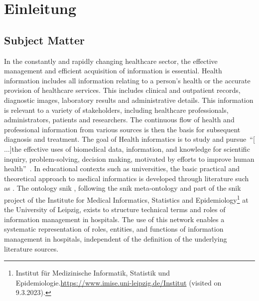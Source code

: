 \chapter{Einleitung}\label{ch:introduction}
\section{Subject Matter}
In the constantly and rapidly changing healthcare sector, the effective management and efficient acquisition of information is essential. 
Health information includes all information relating to a person's health or the accurate provision of healthcare services. 
This includes clinical and outpatient records, diagnostic images, laboratory results and administrative details.
%
This information is relevant to a variety of stakeholders, including healthcare professionals, administrators, patients and researchers. 
The continuous flow of health and professional information from various sources is then the basis for subsequent diagnosis and treatment. 
%
The goal of Health informatics is to study and pursue~\enquote{[$\dots$]the effective uses of biomedical data, information, and knowledge for scientific inquiry, problem-solving, decision making, motivated by efforts to improve human health}\ \citet{jen_informatics_2024}.
In educational contexts such as universities, the basic practical and theoretical approach to medical informatics is developed through literature such as \citet{bb2}. 
The ontology \ac{snik} \citep{semantischesnetz}, following the \ac{snik} meta-ontology and part of the \ac{snik} project of the Institute for Medical Informatics, Statistics and Epidemiology\footnote{\raggedright{}Institut für Medizinische Informatik, Statistik und Epidemiologie.\url{https://www.imise.uni-leipzig.de/Institut} (visited on 9.3.2023).} at the University of Leipzig, exists to structure technical terms and roles of information management in hospitals. 
The use of this network enables a systematic representation of roles, entities, and functions of information management in hospitals, independent of the definition of the underlying literature sources. 
